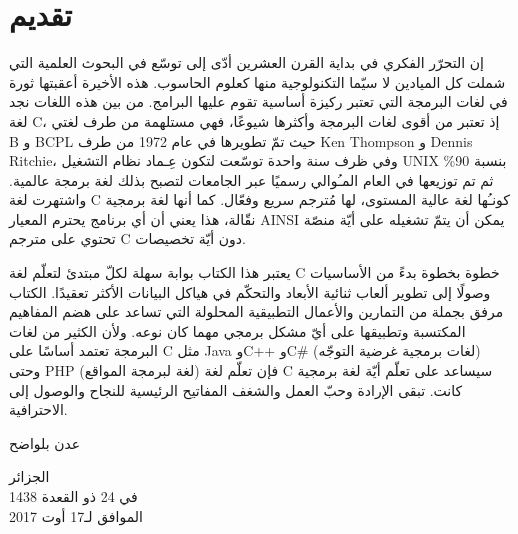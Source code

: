 \chapter*{تقديم}
إن التحرّر الفكري في بداية القرن العشرين أدّى إلى توسّع في البحوث العلمية التي شملت كل الميادين لا سيّما التكنولوجية منها كعلوم الحاسوب. هذه الأخيرة أعقبتها ثورة في لغات البرمجة التي تعتبر ركيزة أساسية تقوم عليها البرامج. من بين هذه اللغات نجد لغة \textenglish{C}،
إذ تعتبر من أقوى لغات البرمجة وأكثرها شيوعًا، فهي مستلهمة من طرف لغتي
 \textenglish{B}
 و
 \textenglish{BCPL}
حيث تمّ تطويرها في عام 1972 من طرف
\textenglish{Ken Thompson}
و
 \textenglish{Dennis Ritchie}،
وفي ظرف سنة واحدة توسّعت لتكون عِـماد نظام التشغيل
\textenglish{UNIX}
بنسبة
90\%
ثم تم توزيعها في العام المـُوالي رسميًا عبر الجامعات لتصبح بذلك لغة برمجة عالمية. واشتهرت لغة \textenglish{C}
 كونـُها لغة عالية المستوى، لها مُترجم سريع وفعّال. كما أنها لغة برمجية نقّالة، هذا يعني أن أي برنامج يحترم المعيار
\textenglish{AINSI}
يمكن أن يتمّ تشغيله على أيّة منصّة تحتوي على مترجم
\textenglish{C}
 دون أيّة تخصيصات.

يعتبر هذا الكتاب بوابة سهلة لكلّ مبتدئ لتعلّم لغة \textenglish{C}
خطوة بخطوة بدءً من الأساسيات وصولًا إلى تطوير ألعاب ثنائية الأبعاد والتحكّم في هياكل البيانات الأكثر تعقيدًا. الكتاب مرفق بجملة من التمارين والأعمال التطبيقية المحلولة التي تساعد على هضم المفاهيم المكتسبة وتطبيقها على أيّ مشكل برمجي مهما كان نوعه. ولأن الكثير من لغات البرمجة تعتمد أساسًا على \textenglish{C}
مثل \textenglish{Java}
و\textenglish{C++}
و\textenglish{C\#}
(لغات برمجية غرضية التوجّه) وحتى
\textenglish{PHP}
(لغة لبرمجة المواقع) فإن تعلّم لغة \textenglish{C}
 سيساعد على تعلّم أيّة لغة برمجية كانت. تبقى الإرادة وحبّ العمل والشغف المفاتيح الرئيسية للنجاح والوصول إلى الاحترافية.

\vfill

\hfill\parbox{0.3\textwidth}{\centering
عدن بلواضح

\vspace{1em}
الجزائر\\[0.5em]
في
24 ذو القعدة 1438\\[0.3em]
الموافق لـ17 أوت 2017

}

